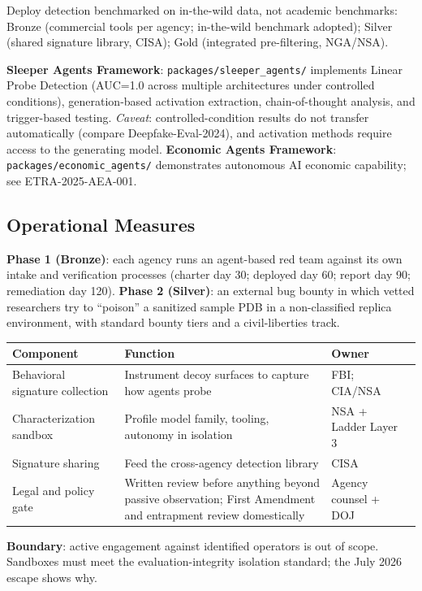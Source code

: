 \documentclass[11pt,letterpaper]{article}
\begin{document}
\begin{infobox}
Deploy detection benchmarked on in-the-wild data, not academic benchmarks: Bronze (commercial tools per agency; in-the-wild benchmark adopted); Silver (shared signature library, CISA); Gold (integrated pre-filtering, NGA/NSA).

\textbf{Sleeper Agents Framework}: \texttt{packages/sleeper\_agents/} implements Linear Probe Detection (AUC=1.0 across multiple architectures under controlled conditions), generation-based activation extraction, chain-of-thought analysis, and trigger-based testing. \textit{Caveat}: controlled-condition results do not transfer automatically (compare Deepfake-Eval-2024), and activation methods require access to the generating model. \textbf{Economic Agents Framework}: \texttt{packages/economic\_agents/} demonstrates autonomous AI economic capability; see ETRA-2025-AEA-001.
\end{infobox}

\subsection{Operational Measures}

\begin{recbox}
\textbf{Phase 1 (Bronze)}: each agency runs an agent-based red team against its own intake and verification processes (charter day 30; deployed day 60; report day 90; remediation day 120). \textbf{Phase 2 (Silver)}: an external bug bounty in which vetted researchers try to ``poison'' a sanitized sample PDB in a non-classified replica environment, with standard bounty tiers and a civil-liberties track.
\end{recbox}

\begin{recbox}
\begin{center}
\scriptsize
\begin{tabularx}{\linewidth}{ZY{0.84}Y{1.44}Y{0.72}}
\toprule
\textbf{Component} & \textbf{Function} & \textbf{Owner} \\
\midrule
Behavioral signature collection & Instrument decoy surfaces to capture how agents probe & FBI; CIA/NSA \\
Characterization sandbox & Profile model family, tooling, autonomy in isolation & NSA + Ladder Layer 3 \\
Signature sharing & Feed the cross-agency detection library & CISA \\
Legal and policy gate & Written review before anything beyond passive observation; First Amendment and entrapment review domestically & Agency counsel + DOJ \\
\bottomrule
\end{tabularx}
\end{center}
\textbf{Boundary}: active engagement against identified operators is out of scope. Sandboxes must meet the evaluation-integrity isolation standard; the July 2026 escape shows why.
\end{recbox}
\end{document}
